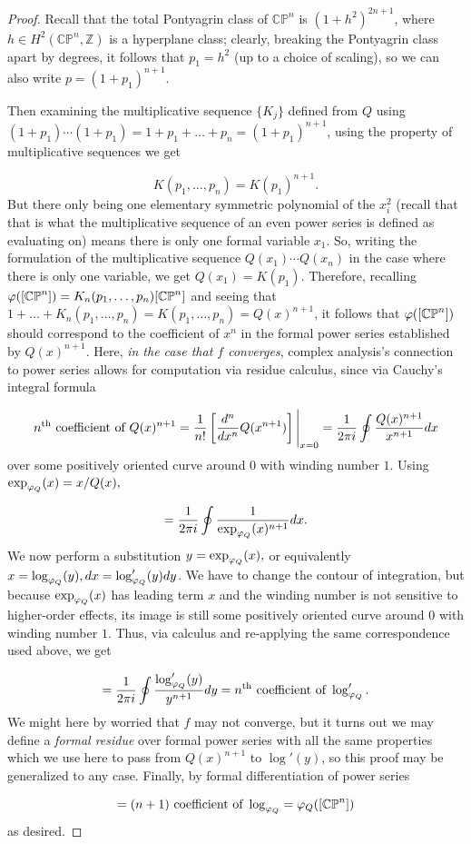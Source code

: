 \begin{proof}
Recall that the total Pontyagrin class of $\mathbb{CP}^n$ is $(1 + h^2)^{2n+1}$, where $h \in H^2 (\mathbb{CP}^n, \mathbb{Z})$ is a hyperplane class; clearly, breaking the Pontyagrin class apart by degrees, it follows that $p_1 = h^2$ (up to a choice of scaling), so we can also write $p = (1 + p_1)^{n+1}$.  

Then examining the multiplicative sequence $\{K_j \}$ defined from $Q$ using $(1 + p_1) \cdots (1 + p_1) = 1 + p_1 + \dots + p_n = (1 + p_1)^{n+1}$, using the property of multiplicative sequences we get

\[K(p_1, \dots, p_n) = K(p_1)^{n+1}.\]
But there only being one elementary symmetric polynomial of the $x_i^2$ (recall that that is what the multiplicative sequence of an even power series is defined as evaluating on) means there is only one formal variable $x_1$. So, writing the formulation of the multiplicative sequence $Q(x_1) \cdots Q(x_n)$ in the case where there is only one variable, we get $Q(x_1) = K(p_1)$. Therefore, recalling $\varphi([\mathbb{CP}^n]) = K_n (p_1, \dots, p_n)[\mathbb{CP}^n]$ and seeing that $1 + \dots + K_n(p_1, \dots, p_n) = K(p_1, \dots, p_n) =Q(x)^{n+1}$, it follows that $\varphi([\mathbb{CP}^n])$ should correspond to the coefficient of $x^n$ in the formal power series established by $Q(x)^{n+1}$. Here, \textit{in the case that $f$ converges}, complex analysis's connection to power series allows for computation via residue calculus, since via Cauchy's integral formula

\[n^{\text{th}} \text{ coefficient of } Q(x)^{n+1} = \frac{1}{n!}  \left[ \frac{d^n}{dx^n} Q(x^{n+1}) \right] \Bigg{|}_{x = 0}  = \frac{1}{ 2 \pi i} \oint \frac{Q(x)^{n+1}}{x^{n+1}}  dx\]
over some positively oriented curve around $0$ with winding number $1$. Using $\exp_{\varphi_Q}(x) = x/Q(x),$

\[  =\frac{1}{ 2 \pi i} \oint \frac{1}{\exp_{\varphi_Q}(x)^{n+1}}  dx.\]
We now perform a substitution $y = \exp_{\varphi_Q}(x),$ or equivalently $x = \log_{\varphi_Q}(y), dx = \log_{\varphi_Q}'(y) dy$. We have to change the contour of integration, but because $\exp_{\varphi_Q} (x)$ has leading term $x$ and the winding number is not sensitive to higher-order effects, its image is still some positively oriented curve around $0$ with winding number $1$. Thus, via calculus and re-applying the same correspondence used above, we get

\[ = \frac{1}{2 \pi i} \oint \frac{\log'_{\varphi_Q} (y)}{y^{n+1}} dy = n^{\text{th}} \text{ coefficient of } \log_{\varphi_Q}'.\]
We might here by worried that $f$ may not converge,  but it turns out we may define a \textit{formal residue} over formal power series with all the same properties which we use here to pass from $Q(x)^{n+1}$ to $\log'(y)$, so this proof  may be generalized to any case. Finally, by formal differentiation of power series

\[ = (n+1)\text{ coefficient of } \log_{\varphi_Q} = \varphi_Q ([\mathbb{CP}^n])\]
as desired.
\end{proof}

